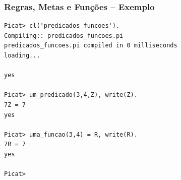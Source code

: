 \begin{frame} [fragile]

\frametitle{Regras, Metas e Funções -- Exemplo}
\begin{footnotesize}
\begin{verbatim}
Picat> cl('predicados_funcoes').
Compiling:: predicados_funcoes.pi
predicados_funcoes.pi compiled in 0 milliseconds
loading...

yes

Picat> um_predicado(3,4,Z), write(Z).
7Z = 7
yes

Picat> uma_funcao(3,4) = R, write(R).
7R = 7
yes

Picat>
\end{verbatim}
\end{footnotesize}
\end{frame}



